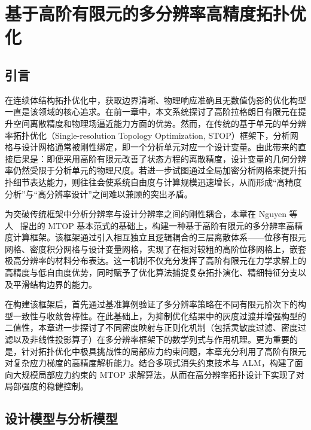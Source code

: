\chapter{基于高阶有限元的多分辨率高精度拓扑优化}
\label{chap:high_fem_mtop}

\iffalse

\section{引言}
\label{sec:ch4_intro}

在连续体结构拓扑优化中，获取边界清晰、物理响应准确且无数值伪影的优化构型一直是该领域的核心追求。在前一章中，本文系统探讨了高阶拉格朗日有限元在提升空间离散精度和物理场逼近能力方面的优势。然而，在传统的基于单元的单分辨率拓扑优化（Single-resolution Topology Optimization, STOP）框架下，分析网格与设计网格通常被刚性绑定，即一个分析单元对应一个设计变量。由此带来的直接后果是：即便采用高阶有限元改善了状态方程的离散精度，设计变量的几何分辨率仍然受限于分析单元的物理尺度。若进一步试图通过全局加密分析网格来提升拓扑细节表达能力，则往往会使系统自由度与计算规模迅速增长，从而形成“高精度分析”与“高分辨率设计”之间难以兼顾的突出矛盾。

为突破传统框架中分析分辨率与设计分辨率之间的刚性耦合，本章在 Nguyen 等人~\cite{nguyenComputationalParadigmMultiresolution2010a} 提出的 MTOP 基本范式的基础上，构建一种基于高阶有限元的多分辨率高精度计算框架。该框架通过引入相互独立且逻辑耦合的三层离散体系——位移有限元网格、密度积分网格与设计变量网格，实现了在相对较粗的高阶位移网格上，嵌套极高分辨率的材料分布表达。这一机制不仅充分发挥了高阶有限元在力学求解上的高精度与低自由度优势，同时赋予了优化算法捕捉复杂拓扑演化、精细特征分支以及平滑结构边界的能力。

在构建该框架后，首先通过基准算例验证了多分辨率策略在不同有限元阶次下的构型一致性与收敛鲁棒性。在此基础上，为抑制优化结果中的灰度过渡并增强构型的二值性，本章进一步探讨了不同密度映射与正则化机制（包括灵敏度过滤、密度过滤以及非线性投影算子）在多分辨率框架下的数学列式与作用机理。更为重要的是，针对拓扑优化中极具挑战性的局部应力约束问题，本章充分利用了高阶有限元对复杂应力梯度的高精度解析能力。结合多项式消失约束技术与 ALM，构建了面向大规模局部应力约束的 MTOP 求解算法，从而在高分辨率拓扑设计下实现了对局部强度的稳健控制。


\section{设计模型与分析模型}
\label{sec:design_analysis_model}

